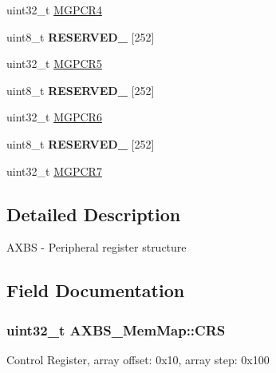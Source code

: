 \begin{DoxyCompactItemize}
\item 
uint32\+\_\+t \hyperlink{struct_a_x_b_s___mem_map_aa612f4c47ff1bbd854bacda326b25aea}{M\+G\+P\+C\+R4}
\item 
\hypertarget{struct_a_x_b_s___mem_map_aa163ab2918180ca89176ceb13b329716}{}uint8\+\_\+t {\bfseries R\+E\+S\+E\+R\+V\+E\+D\+\_} \mbox{[}252\mbox{]}\label{struct_a_x_b_s___mem_map_aa163ab2918180ca89176ceb13b329716}

\item 
uint32\+\_\+t \hyperlink{struct_a_x_b_s___mem_map_acb7e6f493df6513d2eca0df6a7f8f3ed}{M\+G\+P\+C\+R5}
\item 
\hypertarget{struct_a_x_b_s___mem_map_a8ce530a61c570b9634253dedb2bfdd00}{}uint8\+\_\+t {\bfseries R\+E\+S\+E\+R\+V\+E\+D\+\_} \mbox{[}252\mbox{]}\label{struct_a_x_b_s___mem_map_a8ce530a61c570b9634253dedb2bfdd00}

\item 
uint32\+\_\+t \hyperlink{struct_a_x_b_s___mem_map_a0d9951535d34de3707e889bc16f15cef}{M\+G\+P\+C\+R6}
\item 
\hypertarget{struct_a_x_b_s___mem_map_a60f93ced8ce2164878e763cdb47bda04}{}uint8\+\_\+t {\bfseries R\+E\+S\+E\+R\+V\+E\+D\+\_} \mbox{[}252\mbox{]}\label{struct_a_x_b_s___mem_map_a60f93ced8ce2164878e763cdb47bda04}

\item 
uint32\+\_\+t \hyperlink{struct_a_x_b_s___mem_map_ae019ec14abd676615a5828fef3dde919}{M\+G\+P\+C\+R7}
\end{DoxyCompactItemize}


\subsection{Detailed Description}
A\+X\+B\+S -\/ Peripheral register structure 

\subsection{Field Documentation}
\hypertarget{struct_a_x_b_s___mem_map_af4605bf03bb478b8076fffe21d52671f}{}
\subsubsection[{C\+R\+S}]{\setlength{\rightskip}{0pt plus 5cm}uint32\+\_\+t A\+X\+B\+S\+\_\+\+Mem\+Map\+::\+C\+R\+S}\label{struct_a_x_b_s___mem_map_af4605bf03bb478b8076fffe21d52671f}
Control Register, array offset\+: 0x10, array step\+: 0x100 \hypertarget{struct_a_x_b_s___mem_map_a8e6ee199b9eb723478215926f9f3b6fe}{}
